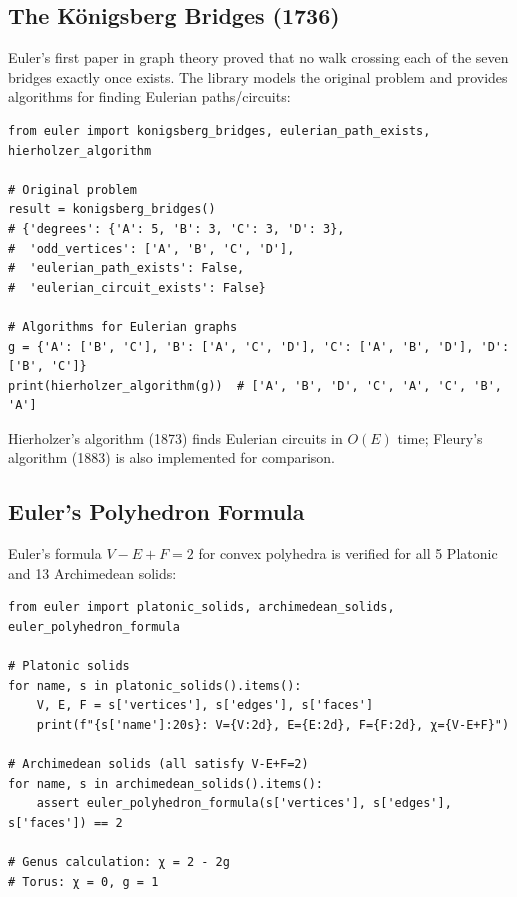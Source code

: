 \documentclass[11pt,a4paper]{article}
\theoremstyle{definition}
\begin{document}
\subsection{The K\"onigsberg Bridges (1736)}
Euler's first paper in graph theory \cite{euler1736} proved that no walk crossing each of the seven bridges exactly once exists. The library models the original problem and provides algorithms for finding Eulerian paths/circuits:

\begin{lstlisting}[caption={K\"onigsberg bridges and Eulerian paths}, label=lst:konigsberg]
from euler import konigsberg_bridges, eulerian_path_exists, hierholzer_algorithm

# Original problem
result = konigsberg_bridges()
# {'degrees': {'A': 5, 'B': 3, 'C': 3, 'D': 3},
#  'odd_vertices': ['A', 'B', 'C', 'D'],
#  'eulerian_path_exists': False,
#  'eulerian_circuit_exists': False}

# Algorithms for Eulerian graphs
g = {'A': ['B', 'C'], 'B': ['A', 'C', 'D'], 'C': ['A', 'B', 'D'], 'D': ['B', 'C']}
print(hierholzer_algorithm(g))  # ['A', 'B', 'D', 'C', 'A', 'C', 'B', 'A']
\end{lstlisting}

Hierholzer's algorithm (1873) finds Eulerian circuits in $O(E)$ time; Fleury's algorithm (1883) is also implemented for comparison.

\subsection{Euler's Polyhedron Formula}
Euler's formula $V - E + F = 2$ for convex polyhedra \cite{euler1752} is verified for all 5 Platonic and 13 Archimedean solids:

\begin{lstlisting}[caption={Polyhedron verification}, label=lst:polyhedra]
from euler import platonic_solids, archimedean_solids, euler_polyhedron_formula

# Platonic solids
for name, s in platonic_solids().items():
    V, E, F = s['vertices'], s['edges'], s['faces']
    print(f"{s['name']:20s}: V={V:2d}, E={E:2d}, F={F:2d}, χ={V-E+F}")

# Archimedean solids (all satisfy V-E+F=2)
for name, s in archimedean_solids().items():
    assert euler_polyhedron_formula(s['vertices'], s['edges'], s['faces']) == 2

# Genus calculation: χ = 2 - 2g
# Torus: χ = 0, g = 1
\end{lstlisting}
\end{document}
